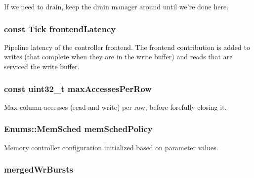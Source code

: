 \label{classDRAMCtrl_a329b71fb934a93312ca0aacbf5a3f982}
If we need to drain, keep the drain manager around until we're done here. \hypertarget{classDRAMCtrl_ad88c33e41f0bdc247328c7420c515f30}{
\subsubsection[{frontendLatency}]{\setlength{\rightskip}{0pt plus 5cm}const {\bf Tick} {\bf frontendLatency}}}
\label{classDRAMCtrl_ad88c33e41f0bdc247328c7420c515f30}
Pipeline latency of the controller frontend. The frontend contribution is added to writes (that complete when they are in the write buffer) and reads that are serviced the write buffer. \hypertarget{classDRAMCtrl_ab0ff1e80c0fcb937ef53eee0175cbd13}{
\subsubsection[{maxAccessesPerRow}]{\setlength{\rightskip}{0pt plus 5cm}const {\bf uint32\_\-t} {\bf maxAccessesPerRow}}}
\label{classDRAMCtrl_ab0ff1e80c0fcb937ef53eee0175cbd13}
Max column accesses (read and write) per row, before forefully closing it. \hypertarget{classDRAMCtrl_a77153a963ea47f1f424595cbc94461e7}{
\subsubsection[{memSchedPolicy}]{\setlength{\rightskip}{0pt plus 5cm}Enums::MemSched {\bf memSchedPolicy}}}
\label{classDRAMCtrl_a77153a963ea47f1f424595cbc94461e7}
Memory controller configuration initialized based on parameter values. \hypertarget{classDRAMCtrl_accaed2ab83bb63d6ddff7bfa861ea537}{
\subsubsection[{mergedWrBursts}]{ {\bf mergedWrBursts}}}
